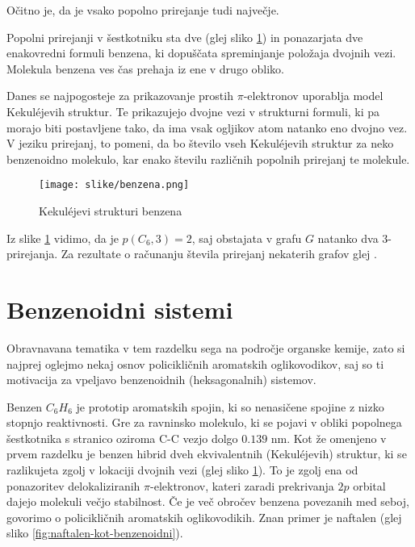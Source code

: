 \documentclass[mat1, tisk]{fmfdelo}
\begin{document}
Očitno je, da je vsako popolno prirejanje tudi največje.

Popolni prirejanji v šestkotniku sta dve (glej sliko \ref{fig:benzen})
in ponazarjata dve enakovredni formuli benzena, 
ki dopuščata spreminjanje položaja dvojnih vezi.
Molekula benzena ves čas prehaja iz ene 
 v drugo obliko.

Danes se najpogosteje za prikazovanje prostih $\pi$-elektronov
uporablja model Kekuléjevih struktur. 
Te prikazujejo dvojne vezi v strukturni formuli, ki
pa morajo biti postavljene tako, da ima
vsak ogljikov atom natanko eno dvojno vez.
V jeziku prirejanj, to pomeni, da bo število
vseh Kekuléjevih struktur za neko benzenoidno molekulo,
kar enako številu različnih popolnih prirejanj te molekule.


\begin{figure}[H]
  \centering
  \texttt{[image: slike/benzena.png]}
  \caption{Kekuléjevi strukturi benzena}
  \label{fig:benzen}
\end{figure}


Iz slike \ref{fig:benzen} vidimo, da je
$p(C_6,3) = 2$, saj obstajata v grafu $G$ natanko
dva $3$-prirejanja.
Za rezultate o računanju števila prirejanj nekaterih grafov glej \cite{4-pri}. 














\section{Benzenoidni sistemi}

Obravnavana tematika v tem razdelku sega na področje organske kemije, 
zato si najprej oglejmo nekaj osnov policikličnih aromatskih oglikovodikov, 
saj so ti motivacija za vpeljavo benzenoidnih (heksagonalnih) sistemov.

Benzen $C_6 H_6$ je prototip aromatskih spojin, ki so nenasičene spojine
z nizko stopnjo reaktivnosti. Gre za ravninsko molekulo, 
ki se pojavi v obliki popolnega šestkotnika s stranico oziroma
C-C vezjo dolgo $0.139$ nm. Kot že omenjeno v prvem razdelku  
je benzen hibrid dveh ekvivalentnih
(Kekuléjevih) struktur, ki se razlikujeta zgolj v lokaciji dvojnih vezi (glej sliko \ref{fig:benzen}).
To je zgolj ena od ponazoritev 
delokaliziranih $\pi$-elektronov, 
kateri zaradi prekrivanja $2p$ orbital dajejo molekuli večjo stabilnost. 
Če je več obročev benzena povezanih med seboj, govorimo o policikličnih
aromatskih oglikovodikih.
Znan primer je naftalen (glej sliko \ref{fig:naftalen-kot-benzenoidni}). 
\end{document}
